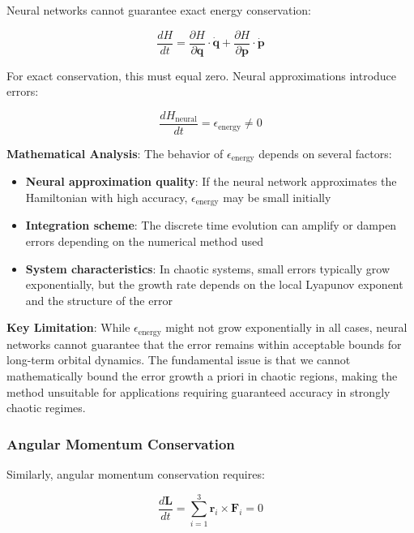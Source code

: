 \documentclass[11pt,a4paper]{article}
\begin{document}
Neural networks cannot guarantee exact energy conservation:

\begin{equation}
\frac{dH}{dt} = \frac{\partial H}{\partial \mathbf{q}} \cdot \dot{\mathbf{q}} + \frac{\partial H}{\partial \mathbf{p}} \cdot \dot{\mathbf{p}}
\end{equation}

For exact conservation, this must equal zero. Neural approximations introduce errors:

\begin{equation}
\frac{dH_{\text{neural}}}{dt} = \epsilon_{\text{energy}} \neq 0
\end{equation}

\textbf{Mathematical Analysis}: The behavior of $\epsilon_{\text{energy}}$ depends on several factors:

\begin{itemize}
    \item \textbf{Neural approximation quality}: If the neural network approximates the Hamiltonian with high accuracy, $\epsilon_{\text{energy}}$ may be small initially
    \item \textbf{Integration scheme}: The discrete time evolution can amplify or dampen errors depending on the numerical method used
    \item \textbf{System characteristics}: In chaotic systems, small errors typically grow exponentially, but the growth rate depends on the local Lyapunov exponent and the structure of the error
\end{itemize}

\textbf{Key Limitation}: While $\epsilon_{\text{energy}}$ might not grow exponentially in all cases, neural networks cannot guarantee that the error remains within acceptable bounds for long-term orbital dynamics. The fundamental issue is that we cannot mathematically bound the error growth a priori in chaotic regions, making the method unsuitable for applications requiring guaranteed accuracy in strongly chaotic regimes.

\subsubsection{Angular Momentum Conservation}

Similarly, angular momentum conservation requires:

\begin{equation}
\frac{d\mathbf{L}}{dt} = \sum_{i=1}^{3} \mathbf{r}_i \times \mathbf{F}_i = 0
\end{equation}
\end{document}
